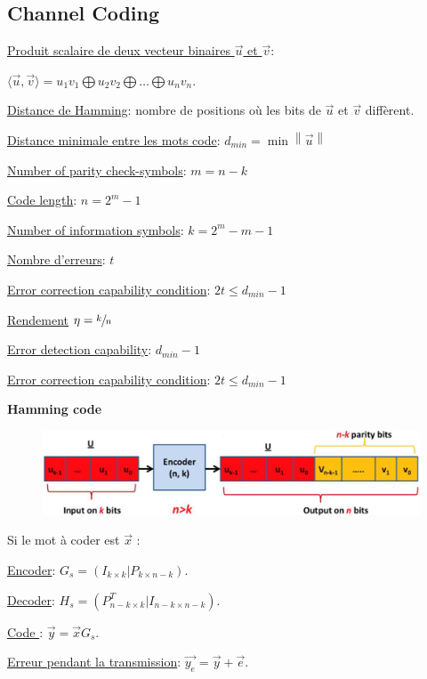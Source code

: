 \subsection*{Channel Coding}
\underline{Produit scalaire de deux vecteur binaires $\overrightarrow{u}$ et $\overrightarrow{v}$}:

$\langle \overrightarrow{u},\overrightarrow{v}\rangle = u_1v_1\bigoplus u_2v_2\bigoplus\dots\bigoplus u_nv_n$.

\underline{Distance de Hamming}: nombre de positions où les bits de $\overrightarrow{u}$ et $\overrightarrow{v}$ diffèrent.

\underline{Distance minimale entre les mots code}: $d_{min}=\min \left\|\overrightarrow{u}\right\|$

\underline{Number of parity check-symbols}: $m=n-k$

\underline{Code length}: $n=2^m-1$

\underline{Number of information symbols}: $k=2^m-m-1$

\underline{Nombre d'erreurs}: $t$

\underline{Error correction capability condition}: $2t\leq d_{min}-1$

\underline{Rendement} $\eta=\sfrac{k}{n}$

\underline{Error detection capability}: $d_{min}-1$

\underline{Error correction capability condition}: $2t\leq d_{min}-1$

\columnbreak

\textbf{Hamming code}

\begin{figure}[H]
    \includegraphics[width=\linewidth]{images/linear_block_codes.png}
\end{figure}
Si le mot à coder est $\overrightarrow{x}$ :

\underline{Encoder}: $G_s = (I_{k\times k}|P_{k\times n-k})$.

\underline{Decoder}: $H_s = (P_{n-k\times k}^T|I_{n-k\times n-k})$.

\underline{Code }: $\overrightarrow{y} = \overrightarrow{x}G_s$.

\underline{Erreur pendant la transmission}: $\overrightarrow{y_e}=\overrightarrow{y}+\overrightarrow{e}$.

